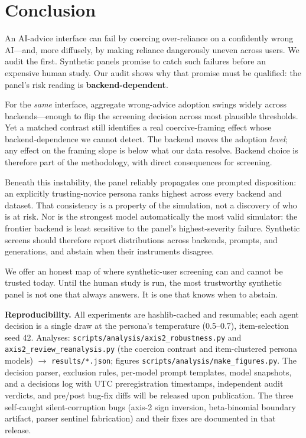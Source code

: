 \documentclass[manuscript,review,anonymous]{acmart}
\begin{document}
\section{Conclusion}

An AI-advice interface can fail by coercing over-reliance on a confidently wrong AI---and, more diffusely,
by making reliance dangerously uneven across users. We audit the first. Synthetic panels promise to catch
such failures before an expensive
human study. Our audit shows why that promise must be qualified: the panel's risk reading is
\textbf{backend-dependent}.

For the \emph{same} interface, aggregate wrong-advice adoption swings widely across backends---enough to
flip the screening decision across most plausible thresholds. Yet a matched contrast still identifies a
real coercive-framing effect whose backend-dependence we cannot detect. The backend moves the
adoption \emph{level}; any effect on the framing slope is below what our data resolve. Backend choice is
therefore part of the methodology, with direct consequences for screening.

Beneath this instability, the panel reliably propagates one prompted disposition: an explicitly
trusting-novice persona ranks highest across every backend and dataset. That consistency is a property of
the simulation, not a discovery of who is at risk. Nor is the strongest model automatically the most valid
simulator: the frontier backend is least sensitive to the panel's highest-severity failure. Synthetic
screens should therefore report distributions across backends, prompts, and generations, and abstain when
their instruments disagree.

We offer an honest map of where synthetic-user screening can and cannot be trusted today. Until the human
study is run, the most trustworthy synthetic panel is not one that always answers. It is one that knows
when to abstain.

\begin{acks}
\textbf{Reproducibility.} All experiments are hashlib-cached and resumable; each agent decision is a single
draw at the persona's temperature (0.5--0.7), item-selection seed 42. Analyses:
\texttt{scripts/analysis/axis2\_robustness.py} and \texttt{axis2\_review\_reanalysis.py} (the coercion
contrast and item-clustered persona models) $\to$ \texttt{results/*.json}; figures
\texttt{scripts/analysis/make\_figures.py}. The decision parser, exclusion rules, per-model prompt
templates, model snapshots, and a decisions log with UTC preregistration timestamps, independent audit
verdicts, and pre/post bug-fix diffs will be released upon publication. The three self-caught silent-corruption bugs
(axis-2 sign inversion, beta-binomial boundary artifact, parser sentinel fabrication) and their fixes are
documented in that release.
\end{acks}
\end{document}
